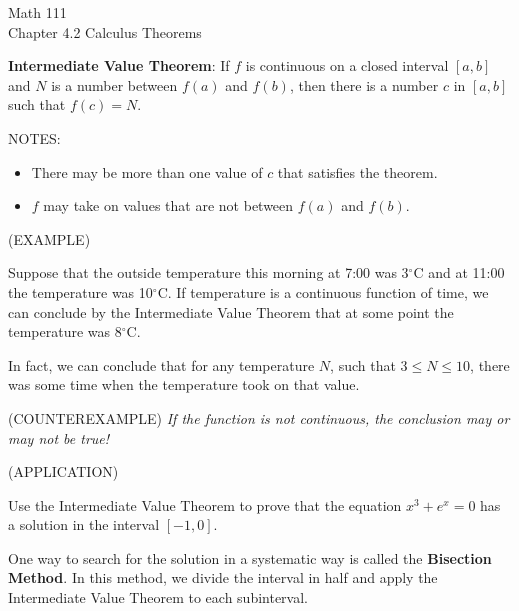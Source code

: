 \documentclass[11pt]{article}
\begin{document}
\begin{center}
\Large
\rm{Math 111}
\\
\rm{Chapter 4.2 Calculus Theorems}
\\
\end{center}
\vspace{0.2in}


{\bf Intermediate Value Theorem}:  If $f$ is continuous on a closed interval $[a,b]$ and $N$ is a number
between $f(a)$ and $f(b)$, then there is a number $c$ in $[a,b]$ such that $f(c)=N$.

\vspace{1.5in}


NOTES:

\begin{itemize}
\item{There may be more than one value of $c$ that satisfies the theorem.}
\vspace{1in}
\item{$f$ may take on values that are not between $f(a)$ and $f(b)$.}
  \vspace{1in}
  \end{itemize}

(EXAMPLE)

Suppose that the outside temperature this morning at 7:00 was 3$^{\circ}$C and at 11:00 the temperature was 10$^{\circ}$C.
If temperature is a continuous function of time, we can conclude by the Intermediate Value Theorem
that at some point the temperature was 8$^{\circ}$C.

In fact, we can conclude that for any temperature $N$, such that $3\leq N \leq 10$, there was some time when the temperature
took on that value.


(COUNTEREXAMPLE)
\emph{If the function is not continuous, the conclusion may or may not be true!}

\pagebreak

(APPLICATION)

Use the Intermediate Value Theorem to prove that the equation $x^3+e^x=0$ has a solution in the interval $[-1,0]$.

\vspace{1in}

One way to search for the solution in a systematic way is called the {\bf Bisection Method}.  In this method, we divide the interval
in half and apply the Intermediate Value Theorem to each subinterval.

\vspace{1.5in}
\end{document}
